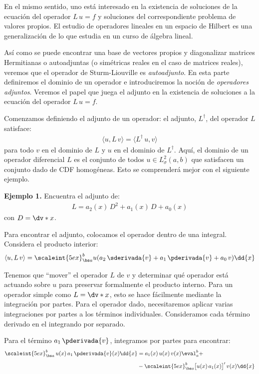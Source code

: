 En el mismo sentido, uno está interesado en la existencia de soluciones de la ecuación del operador $L \, u = f$ y soluciones del correspondiente problema de valores propios. El estudio de operadores lineales en un espacio de Hilbert es una generalización de lo que estudia en un curso de álgebra lineal.
\par
Así como se puede encontrar una base de vectores propios y diagonalizar matrices Hermitianas o autoadjuntas (o simétricas reales en el caso de matrices reales), veremos que el operador de Sturm-Liouville es \emph{autoadjunto}. En esta parte definiremos el dominio de un operador e introduciremos la noción de \emph{operadores adjuntos}. Veremos el papel que juega el adjunto en la existencia de soluciones a la ecuación del operador $L \, u = f$.
\par
Comenzamos definiendo el adjunto de un operador: el adjunto, $L^{\dagger}$, del operador $L$ satisface:
\begin{align*}
\langle u, L \, v \rangle = \langle L^{\dagger} \, u,  v \rangle
\end{align*}
para todo $v$ en el dominio de $L$ y $u$ en el dominio de $L^{\dagger}$. Aquí, el dominio de un operador diferencial $L$ es el conjunto de todos $u \in L_{\sigma}^{2} (a, b)$ que satisfacen un conjunto dado de CDF homogéneas. Esto se comprenderá mejor con el siguiente ejemplo.
\par
\noindent
\textbf{Ejemplo 1.} Encuentra el adjunto de:
\begin{align*}
L = a_{2} (x) \, D^{2} + a_{1} (x) \, D + a_{0} (x)
\end{align*}
con $D = \dv*{x}$.
\par
\noindent
Para encontrar el adjunto, colocamos el operador dentro de una integral. Considera el producto interior:
\begin{align*}
\langle u , L \, v \rangle = \scaleint{5ex}_{\bs a}^{b} u (a_{2} \, \sderivada{v} + a_{1} \, \pderivada{v} + a_{0} \, v) \dd{x}
\end{align*}

Tenemos que \enquote{mover} el operador $L$ de $v$ y determinar qué operador está actuando sobre $u$ para preservar formalmente el producto interno. Para un operador simple como $L = \dv*{x}$, esto se hace fácilmente mediante la integración por partes. Para el operador dado, necesitaremos aplicar varias integraciones por partes a los términos individuales. Consideramos cada término derivado en el integrando por separado.
\par
Para el término $a_{1} \, \pderivada{v}$, integramos por partes para encontrar:
\begin{align}
\begin{aligned}[b]
\scaleint{5ex}_{\bs a}^{b} \, u(x) \, a_{1} \, \pderivada{v}(x) \dd{x} &= a_{1}(x) \, u(x) \, v(x) \eval_{a}^{b} + \\[0.5em]
&- \scaleint{5ex}_{\bs a}^{b} \big[ u(x) \, a_{1} (x) \big]^{\prime} \, v(x) \dd{x}
\end{aligned}
\label{eq:ecuacion_04_17}
\end{align}


